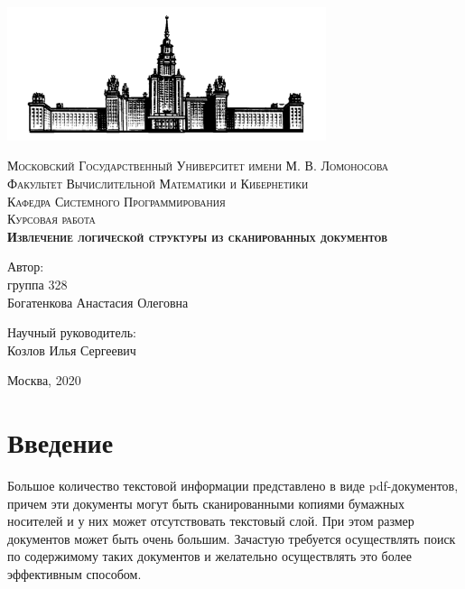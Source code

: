 \documentclass[a4paper,12pt]{article}
\begin{document}
\begin{titlepage}
\begin{center}

\includegraphics[width=0.7\textwidth]{pics/logo.png}

\textsc{\normalsize Московский Государственный Университет имени М. В. Ломоносова}\\
\textsc{\small Факультет Вычислительной Математики и Кибернетики}\\
\textsc{\small Кафедра Системного Программирования}\\[1.5cm]

\textsc{\Large Курсовая работа }\\[0.5cm]
\textsc{ \bf \Large  Извлечение логической структуры из сканированных документов }\\[1.2cm]

\vspace{3cm}
\begin{flushright}
Автор: \\
группа 328 \\
Богатенкова Анастасия Олеговна
\end{flushright}
\begin{flushright}
Научный руководитель: \\
Козлов Илья Сергеевич
\end{flushright}

\vspace{3cm}
{ Москва, 2020}\\[0.2cm]

\vfill

\end{center}
\end{titlepage}

\tableofcontents

\newpage 
\section*{Введение}

Большое количество текстовой информации представлено в виде pdf-документов, причем эти документы могут быть сканированными копиями бумажных носителей и у них может отсутствовать текстовый слой. При этом размер документов может быть очень большим. Зачастую требуется осуществлять поиск по содержимому таких документов и желательно осуществлять это более эффективным способом.
\end{document}
